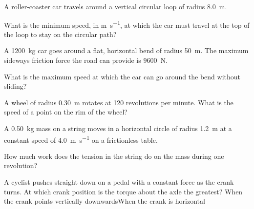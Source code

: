 \begin{quizq}{}
A roller-coaster car travels around a vertical circular loop of radius \qty{8.0}{m}.
\begin{center}
\end{center}
What is the minimum speed, in \si{m.s^{-1}}, at which the car must travel at the top of the loop
to stay on the circular path?
\end{quizq}

\begin{quizq}{}
A \qty{1200}{kg} car goes around a flat, horizontal bend of radius \qty{50}{m}. The maximum
sideways friction force the road can provide is \qty{9600}{N}.

What is the maximum speed at which the car can go around the bend without sliding?
\end{quizq}

\begin{quizq}{}
A wheel of radius \qty{0.30}{m} rotates at 120 revolutions per minute. What is the speed of a point
on the rim of the wheel?
\end{quizq}

\begin{quizq}{}
A \qty{0.50}{kg} mass on a string moves in a horizontal circle of radius \qty{1.2}{m} at a constant
speed of \qty{4.0}{m.s^{-1}} on a frictionless table.

How much work does the tension in the string do on the mass during one revolution?
\end{quizq}

\begin{quizq}{}
A cyclist pushes straight down on a pedal with a constant force as the crank turns. At which crank
position is the torque about the axle the greatest?
  {When the crank points vertically downwards}{When the crank is horizontal}
\end{quizq}
